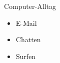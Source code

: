 

\begin{frame}{Computer-Alltag}

\begin{itemize}
\item E-Mail
\item Chatten
\item Surfen
\end{itemize}

\end{frame}